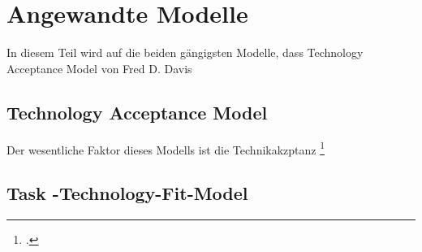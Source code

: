 \section{Angewandte Modelle}
\label{ch:Modelle}

In diesem Teil wird auf die beiden gängigsten Modelle, dass Technology Acceptance Model von Fred D. Davis 

\subsection{Technology Acceptance Model}
\label{TAM}

Der wesentliche Faktor dieses Modells ist die Technikakzptanz \footcite[S. 319]{Davis}

\subsection{Task -Technology-Fit-Model}
\label{ch:TTF}

\cite{kurasi}

\cite{obarSocialMedia}




